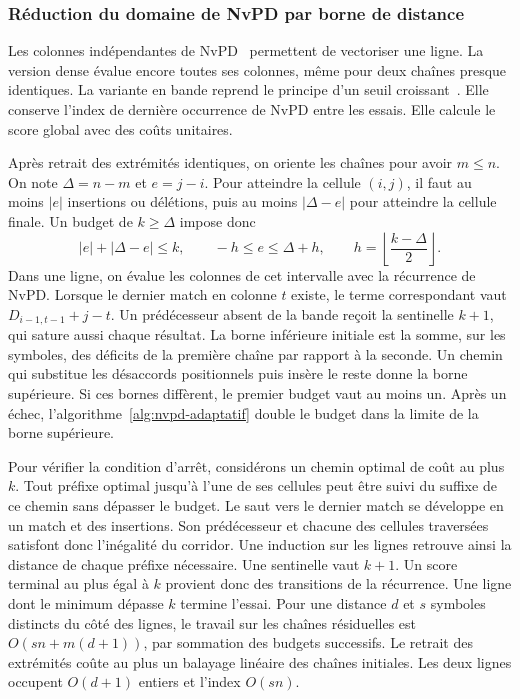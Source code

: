 \subsubsection{Réduction du domaine de NvPD par borne de distance}\label{sec:nvpd-adaptatif}

Les colonnes indépendantes de NvPD~\cite{sadiq} permettent de vectoriser une ligne. La version dense évalue encore toutes ses colonnes, même pour deux chaînes presque identiques. La variante en bande reprend le principe d'un seuil croissant~\cite{ukkonen}. Elle conserve l'index de dernière occurrence de NvPD entre les essais. Elle calcule le score global avec des coûts unitaires.

Après retrait des extrémités identiques, on oriente les chaînes pour avoir \(m\leq n\). On note \(\Delta=n-m\) et \(e=j-i\). Pour atteindre la cellule \((i,j)\), il faut au moins \(|e|\) insertions ou délétions, puis au moins \(|\Delta-e|\) pour atteindre la cellule finale. Un budget de \(k\geq\Delta\) impose donc
\[
 |e|+|\Delta-e|\leq k,\qquad
 -h\leq e\leq\Delta+h,\qquad
 h=\left\lfloor\frac{k-\Delta}{2}\right\rfloor .
\]
Dans une ligne, on évalue les colonnes de cet intervalle avec la récurrence de NvPD. Lorsque le dernier match en colonne \(t\) existe, le terme correspondant vaut \(D_{i-1,t-1}+j-t\). Un prédécesseur absent de la bande reçoit la sentinelle \(k+1\), qui sature aussi chaque résultat. La borne inférieure initiale est la somme, sur les symboles, des déficits de la première chaîne par rapport à la seconde. Un chemin qui substitue les désaccords positionnels puis insère le reste donne la borne supérieure. Si ces bornes diffèrent, le premier budget vaut au moins un. Après un échec, l’algorithme~\ref{alg:nvpd-adaptatif} double le budget dans la limite de la borne supérieure.

Pour vérifier la condition d’arrêt, considérons un chemin optimal de coût au plus \(k\). Tout préfixe optimal jusqu'à l'une de ses cellules peut être suivi du suffixe de ce chemin sans dépasser le budget. Le saut vers le dernier match se développe en un match et des insertions. Son prédécesseur et chacune des cellules traversées satisfont donc l'inégalité du corridor. Une induction sur les lignes retrouve ainsi la distance de chaque préfixe nécessaire. Une sentinelle vaut \(k+1\). Un score terminal au plus égal à \(k\) provient donc des transitions de la récurrence. Une ligne dont le minimum dépasse \(k\) termine l'essai. Pour une distance \(d\) et \(s\) symboles distincts du côté des lignes, le travail sur les chaînes résiduelles est \(O(sn+m(d+1))\), par sommation des budgets successifs. Le retrait des extrémités coûte au plus un balayage linéaire des chaînes initiales. Les deux lignes occupent \(O(d+1)\) entiers et l'index \(O(sn)\).

